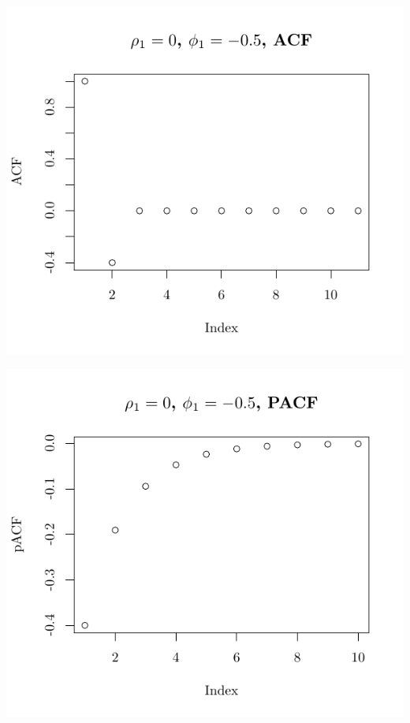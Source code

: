 \documentclass[10pt]{paper}\usepackage[]{graphicx}\usepackage[]{color}
\makeatletter
\def\maxwidth{ %
  \ifdim\Gin@nat@width>\linewidth
    \linewidth
  \else
    \Gin@nat@width
  \fi
}
\newenvironment{knitrout}{}{} %
\makeatother
\begin{document}
\begin{knitrout}
{\centering \includegraphics[width=\maxwidth]{figure/graphics-plotter-17} 

}




{\centering \includegraphics[width=\maxwidth]{figure/graphics-plotter-18} 

}





\end{knitrout}
\end{document}

